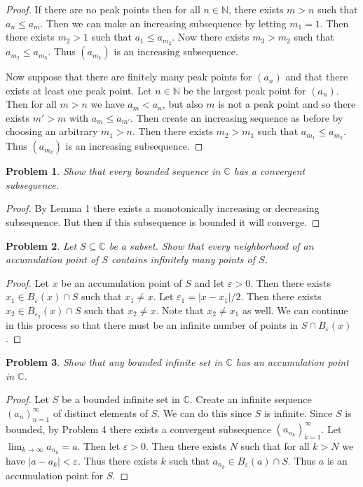 \documentclass{article}
\newtheorem{problem}{Problem}
\begin{document}
\begin{flushleft}
\begin{proof}
If there are no peak points then for all $n \in \mathbb{N}$, there exists $m>n$ such that $a_n \leq a_m$. Then we can make an increasing subsequence by letting $m_1 = 1$. Then there exists $m_2 > 1$ such that $a_1 \leq a_{m_2}$. Now there exists $m_3 > m_2$ such that $a_{m_2} \leq a_{m_3}$. Thus $(a_{m_k})$ is an increasing subsequence.\newline

Now suppose that there are finitely many peak points for $(a_n)$ and that there exists at least one peak point. Let $n \in \mathbb{N}$ be the largest peak point for $(a_n)$. Then for all $m>n$ we have $a_m < a_n$, but also $m$ is not a peak point and so there exists $m' > m$ with $a_m \leq a_{m'}$. Then create an increasing sequence as before by choosing an arbitrary $m_1>n$. Then there exists $m_2 > m_1$ such that $a_{m_1} \leq a_{m_2}$. Thus $(a_{m_k})$ is an increasing subsequence.
\end{proof}

\begin{problem}
Show that every bounded sequence in $\mathbb{C}$ has a convergent subsequence.
\end{problem}
\begin{proof}
By Lemma 1 there exists a monotonically increasing or decreasing subsequence. But then if this subsequence is bounded it will converge.
\end{proof}

\begin{problem}
Let $S \subseteq \mathbb{C}$ be a subset. Show that every neighborhood of an accumulation point of $S$ contains infinitely many points of $S$.
\end{problem}
\begin{proof}
Let $x$ be an accumulation point of $S$ and let $\varepsilon > 0$. Then there exists $x_1 \in B_{\varepsilon}(x) \cap S$ such that $x_1 \neq x$. Let $\varepsilon_1 = |x - x_1|/2$. Then there exists $x_2 \in B_{\varepsilon_2}(x) \cap S$ such that $x_2 \neq x$. Note that $x_2 \neq x_1$ as well. We can continue in this process so that there must be an infinite number of points in $S \cap B_{\varepsilon}(x)$.
\end{proof}

\begin{problem}
Show that any bounded infinite set in $\mathbb{C}$ has an accumulation point in $\mathbb{C}$.
\end{problem}
\begin{proof}
Let $S$ be a bounded infinite set in $\mathbb{C}$. Create an infinite sequence $(a_n)_{n=1}^{\infty}$ of distinct elements of $S$. We can do this since $S$ is infinite. Since $S$ is bounded, by Problem 4 there exists a convergent subsequence $(a_{n_k})_{k=1}^{\infty}$. Let $\lim_{k \rightarrow \infty} a_{n_k} = a$. Then let $\varepsilon > 0$. Then there exists $N$ such that for all $k > N$ we have $|a - a_k| < \varepsilon$. Thus there exists $k$ such that $a_{n_k} \in B_{\varepsilon}(a) \cap S$. Thus $a$ is an accumulation point for $S$.
\end{proof}

\end{flushleft}
\end{document}
